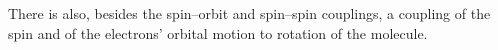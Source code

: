 There is also, besides the spin--orbit and spin--spin couplings, a coupling of the spin and of the electrons' orbital motion to rotation of the molecule.
